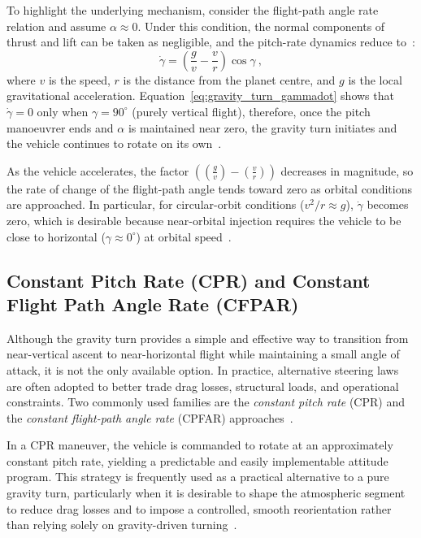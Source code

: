 To highlight the underlying mechanism, consider the flight-path angle rate relation and assume $\alpha \approx 0$. Under this condition, the normal components of thrust and lift can be taken as negligible, and the pitch-rate dynamics reduce to~\cite{Ulrich}:
\begin{equation}
\dot{\gamma}=\left(\frac{g}{v}-\frac{v}{r}\right)\cos\gamma \ ,
\label{eq:gravity_turn_gammadot}
\end{equation}
where $v$ is the speed, $r$ is the distance from the planet centre, and $g$ is the local gravitational acceleration.
Equation~\eqref{eq:gravity_turn_gammadot} shows that $\dot{\gamma}=0$ only when $\gamma=90^\circ$ (purely vertical flight), therefore, once the pitch manoeuvrer ends and $\alpha$ is maintained near zero, the gravity turn initiates and the vehicle continues to rotate on its own~\cite{Ulrich}.

As the vehicle accelerates, the factor $\left((\frac{g}{v})-(\frac{v}{r})\right)$ decreases in magnitude, so the rate of change of the flight-path angle tends toward zero as orbital conditions are approached. In particular, for circular-orbit conditions ($v^2/r \approx g$), $\dot{\gamma}$ becomes zero, which is desirable because near-orbital injection requires the vehicle to be close to horizontal ($\gamma \approx 0^\circ$) at orbital speed~\cite{Edberg}.


\subsection{Constant Pitch Rate (CPR) and Constant Flight Path Angle Rate (CFPAR)}

Although the gravity turn provides a simple and effective way to transition from near-vertical ascent to near-horizontal flight while maintaining a small angle of attack, it is not the only available option. In practice, alternative steering laws are often adopted to better trade drag losses, structural loads, and operational constraints. Two commonly used families are the \emph{constant pitch rate} (CPR) and the \emph{constant flight-path angle rate} (CPFAR) approaches~\cite{Ulrich}.

In a CPR maneuver, the vehicle is commanded to rotate at an approximately constant pitch rate, yielding a predictable and easily implementable attitude program. This strategy is frequently used as a practical alternative to a pure gravity turn, particularly when it is desirable to shape the atmospheric segment to reduce drag losses and to impose a controlled, smooth reorientation rather than relying solely on gravity-driven turning~\cite{Ulrich}.

